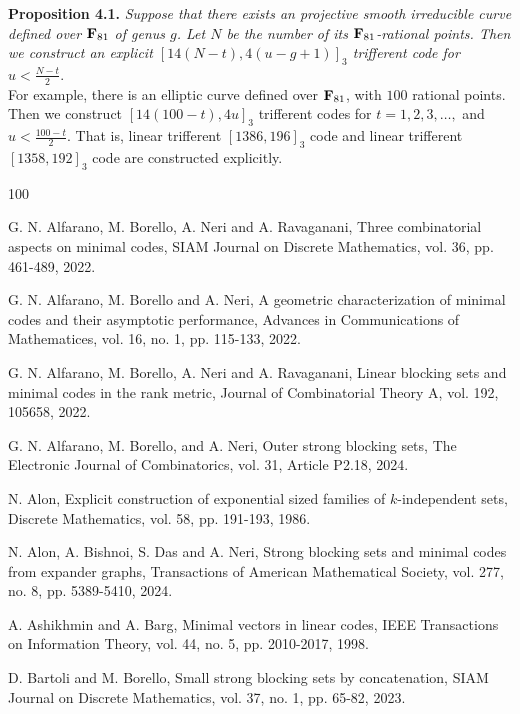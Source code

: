 \documentclass[12pt]{article}
\begin{document}
{\bf Proposition 4.1.} {\em Suppose that there exists an projective smooth irreducible curve defined over ${\bf F}_{81}$
of genus $g$. Let $N$ be the number of its ${\bf F}_{81}$-rational points. Then we construct an explicit $[14(N-t),4(u-g+1)]_3$ trifferent code for $u < \frac{N-t}{2}.$}\\

For example, there is an elliptic curve defined over ${\bf F}_{81}$, with $100$ rational points. Then we construct $[14(100-t), 4u]_3$ trifferent codes for $t=1,2,3,\ldots,$ and $u < \frac{100-t}{2}.$ That is, linear trifferent $[1386,196]_3$ code and linear trifferent $[1358,192]_3$ code are constructed explicitly.\\


\begin{thebibliography}{100}

 G. N. Alfarano, M. Borello, A. Neri and A. Ravaganani, Three combinatorial aspects on minimal codes, SIAM Journal on Discrete Mathematics, vol. 36, pp. 461-489, 2022.

 G. N. Alfarano, M. Borello and A. Neri, A geometric characterization
of minimal codes and their asymptotic performance, Advances in Communications of Mathematices, vol. 16, no. 1, pp. 115-133, 2022.

 G. N. Alfarano, M. Borello, A. Neri and A. Ravaganani, Linear blocking sets and minimal codes in the rank metric, Journal of Combinatorial Theory A, vol. 192, 105658, 2022.

  G. N. Alfarano, M. Borello, and A. Neri, Outer strong blocking sets, The Electronic Journal of Combinatorics, vol. 31, Article P2.18, 2024.


 N. Alon, Explicit construction of exponential sized families of $k$-independent sets, Discrete Mathematics, vol. 58, pp. 191-193, 1986.


 N. Alon, A. Bishnoi, S. Das and A. Neri, Strong blocking sets and minimal codes from expander graphs, Transactions of American Mathematical Society, vol. 277, no. 8, pp. 5389-5410, 2024.


 A. Ashikhmin and A. Barg, Minimal vectors in linear codes, IEEE Transactions on Information Theory, vol. 44, no. 5, pp. 2010-2017, 1998.

 D. Bartoli and M. Borello, Small strong blocking sets by concatenation, SIAM Journal on
Discrete Mathematics, vol. 37, no. 1, pp. 65-82, 2023.



\end{thebibliography}
\end{document}
